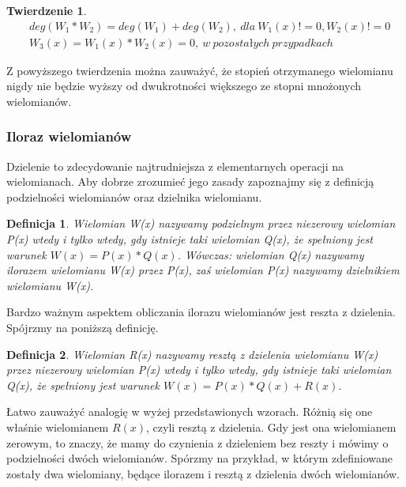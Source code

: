 \documentclass[twoside,a4paper]{book}
\newtheorem{theorem}{Twierdzenie}
\newtheorem{definition}{Definicja}
\begin{document}
\begin{theorem}
	\begin{equation}
	\begin{split}
	&deg(W_1 * W_2) = deg(W_1) + deg(W_2),\ dla\ W_1(x) != 0, W_2(x) != 0 \\
	&W_3(x) = W_1(x) * W_2(x) = 0,\ w \ pozostałych\ przypadkach
	\end{split}
	\end{equation}
\end{theorem}

Z powyższego twierdzenia można zauważyć, że stopień otrzymanego wielomianu nigdy nie będzie wyższy od dwukrotności większego ze stopni mnożonych wielomianów.

\subsubsection{Iloraz wielomianów}

Dzielenie to zdecydowanie najtrudniejsza z elementarnych operacji na wielomianach. Aby dobrze zrozumieć jego zasady zapoznajmy się z definicją podzielności wielomianów oraz dzielnika wielomianu.

\begin{definition}
	Wielomian W(x) nazywamy podzielnym przez niezerowy wielomian P(x) wtedy i tylko wtedy, gdy istnieje taki wielomian Q(x), że spełniony jest warunek $W(x) = P(x) * Q(x)$. Wówczas: wielomian Q(x) nazywamy ilorazem wielomianu W(x) przez P(x), zaś wielomian P(x) nazywamy dzielnikiem wielomianu W(x).
\end{definition}

Bardzo ważnym aspektem obliczania ilorazu wielomianów jest reszta z dzielenia. Spójrzmy na poniższą definicję.

\begin{definition}
	Wielomian R(x) nazywamy resztą z dzielenia wielomianu W(x) przez niezerowy wielomian P(x) wtedy i tylko wtedy, gdy istnieje taki wielomian Q(x), że spełniony jest warunek $W(x) = P(x) * Q(x) + R(x)$.
\end{definition}

Łatwo zauważyć analogię w wyżej przedstawionych wzorach. Różnią się one właśnie wielomianem $R(x)$, czyli resztą z dzielenia. Gdy jest ona wielomianem zerowym, to znaczy, że mamy do czynienia z dzieleniem bez reszty i mówimy o podzielności dwóch wielomianów. Spórzmy na przykład, w którym zdefiniowane zostały dwa wielomiany, będące ilorazem i resztą z dzielenia dwóch wielomianów.
\end{document}
